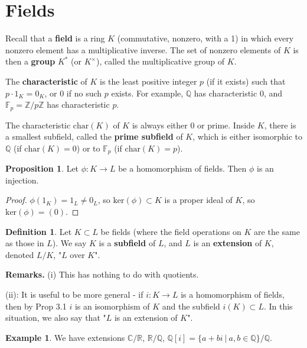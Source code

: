 \documentclass{article}
\theoremstyle{definition}
\newtheorem{prop}[theorem]{Proposition}
\newtheorem{example}{Example}[section]
\newtheorem{defn}{Definition}[section]
\begin{document}

\section{Fields}

Recall that a \textbf{field}  is a ring $K$ (commutative, nonzero, with a 1) in which every nonzero element has a multiplicative inverse. The set of nonzero elements of $K$ is then a \textbf{group} $K^*$ (or $K^\times$), called the multiplicative group of $K$.
\vspace{1mm}

The \textbf{characteristic} of $K$ is the least positive integer $p$ (if it exists) such that $p \cdot 1_K = 0_K$, or 0 if no such $p$ exists.
For example, $\mathbb{Q}$ has characteristic $0$, and $\mathbb{F}_p = \mathbb{Z}/p\mathbb{Z}$ has characteristic $p$.
\vspace{1mm}

The characteristic $\text{char}(K)$ of $K$ is always either 0 or prime. Inside $K$, there is a smallest subfield, called the \textbf{prime subfield} of $K$, which is either isomorphic to $\mathbb{Q}$ (if $\text{char}(K)=0$) or to $\mathbb{F}_p$ (if $\text{char}(K)=p$).

\begin{prop}
    Let $\phi : K \to L$ be a homomorphism of fields. Then $\phi$ is an injection.
\end{prop}
\begin{proof}
    $\phi(1_K) = 1_L \neq 0_L$, so $\text{ker}(\phi) \subset K$ is a proper ideal of $K$, so $\text{ker}(\phi) = (0)$.
\end{proof}

\begin{defn}
    Let $K \subset L$ be fields (where the field operations on $K$ are the same as those in $L$). We say $K$ is a \textbf{subfield}  of $L$, and $L$ is an \textbf{extension} of $K$, denoted $L/K$, "$L$ over $K$".
\end{defn}
\textbf{Remarks.} (i) This has nothing to do with quotients.
\vspace{1mm}

(ii): It is useful to be more general - if $i : K \to L$ is a homomorphism of fields, then by Prop 3.1 $i$ is an isomorphism of $K$ and the subfield $i(K) \subset L$. In this situation, we also say that "$L$ is an extension of $K$".

\begin{example}
    We have extensions $\mathbb{C}/\mathbb{R}$, $\mathbb{R}/\mathbb{Q}$, $\mathbb{Q}[i] = \{a+bi ~|~ a,b \in \mathbb{Q}\}/ \mathbb{Q}$.
\end{example}
\end{document}
